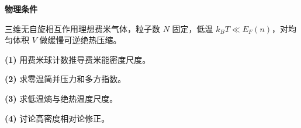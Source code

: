 \textbf{物理条件}\par 三维无自旋相互作用理想费米气体，粒子数 \(N\) 固定，低温 \(k_BT\ll E_F(n)\)，对均匀体积 \(V\) 做缓慢可逆绝热压缩。
\par\noindent\textbf{(1)} 用费米球计数推导费米能密度尺度。
\par\noindent\textbf{(2)} 求零温简并压力和多方指数。
\par\noindent\textbf{(3)} 求低温熵与绝热温度尺度。
\par\noindent\textbf{(4)} 讨论高密度相对论修正。

